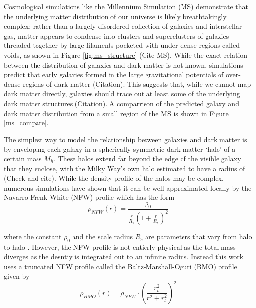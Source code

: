 \documentclass[%
 reprint,
 amsmath,amssymb,
 aps,nofootinbib
]{revtex4-1}
\begin{document}

Cosmological simulations like the Millennium Simulation (MS) demonstrate that the underlying matter distribution of our universe is likely breathtakingly complex; rather than a largely disordered collection of galaxies and interstellar gas, matter appears to condense into clusters and superclusters of galaxies threaded together by large filaments pocketed with under-dense regions called voids, as shown in Figure \ref{fig:ms_structure} (Cite MS). While the exact relation between the distribution of galaxies and dark matter is not known, simulations predict that early galaxies formed in the large gravitational potentials of over-dense regions of dark matter (Citation). This suggests that, while we cannot map dark matter directly, galaxies should trace out at least some of the underlying dark matter structures (Citation). A comparrison of the predicted galaxy and dark matter distribution from a small region of the MS is shown in Figure \ref{ms_compare}.


The simplest way to model the relationship between galaxies and dark matter is by enveloping each galaxy in a spherically symmetric dark matter `halo' of a certain mass $M_h$. These halos extend far beyond the edge of the visible galaxy that they enclose, with the Milky Way's own halo estimated to have a radius of (Check and cite). While the density profile of the halos may be complex, numerous simulations have shown that it can be well approximated locally by the Navarro-Frenk-White (NFW) profile which has the form
\begin{equation}\label{nfw_profile}
\rho_{NFW}(r)=\frac{\rho_0}{\frac{r}{R_s}\left(1+\frac{r}{R_s}\right)^2}
\end{equation}

\noindent where the constant $\rho_0$ and the scale radius $R_s$ are parameters that vary from halo to halo \cite{nfw}. However, the NFW profile is not entierly physical as the total mass diverges as the desntiy is integrated out to an infinite radius. Instead this work uses a truncated NFW profile called the Baltz-Marshall-Oguri (BMO) profile given by
\begin{equation}\label{bmo_profile}
\rho_{BMO}(r)=\rho_{NFW}\cdot\left(\frac{r_t^2}{r^2+r_t^2}\right)^2
\end{equation}
\end{document}
